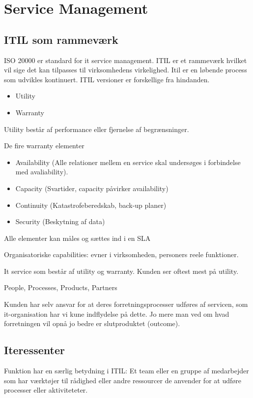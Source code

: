 \section{Service Management}
\subsection{ITIL som rammeværk}
ISO 20000 er standard for it service management. ITIL er et rammeværk hvilket vil sige det kan tilpasses til virksomhedens virkelighed.
Itil er en løbende process som udvikles kontinuert. ITIL versioner er forskellige fra hindanden.

\begin{itemize}
\item Utility
\item Warranty
\end{itemize}

Utility består af performance eller fjernelse af begrænsninger.

De fire warranty elementer
\begin{itemize}
\item Availability (Alle relationer mellem en service skal undersøges i forbindelse med avaliability).
\item Capacity (Svartider, capacity påvirker availability)
\item Continuity (Katastrofeberedskab, back-up planer)
\item Security (Beskytning af data)
\end{itemize}

Alle elementer kan måles og sættes ind i en SLA

Organisatoriske capabilities: evner i virksomheden, personers reele funktioner.

It service som består af utility og warranty. Kunden ser oftest mest på utility.

People, Processes, Products, Partners

Kunden har selv ansvar for at deres forretningsprocesser udføres af servicen, som it-organisation har vi kune indflydelse på dette. Jo mere man ved om hvad forretningen vil opnå jo bedre er slutproduktet (outcome).

\subsection{Iteressenter}
Funktion har en særlig betydning i ITIL: Et team eller en gruppe af medarbejder som har værktøjer til rådighed eller andre ressourcer de anvender for at udføre processer eller aktiviteteter.

